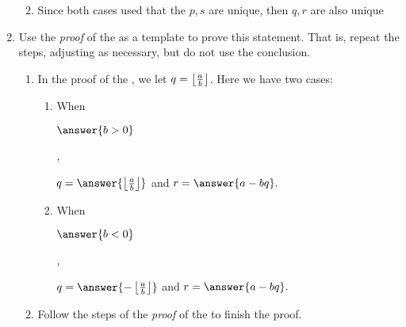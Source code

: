 \documentclass{ximera}
\begin{document}
\begin{br}
\begin{enumerate}
\begin{enumerate}
\begin{enumerate}
      		\end{enumerate}
      		\item Since both cases used that the $p,s$ are unique, then $q,r$ are also unique
	\end{enumerate}
    	\item Use the \emph{proof} of the  as a template to prove this statement. That is, repeat the steps, adjusting as necessary, but do not use the conclusion.
    	\begin{enumerate}
    		\item In the proof of the , we let $q=\left\lfloor \frac{a}{b}\right\rfloor$. Here we have two cases:
    		\begin{enumerate}
      			\item When 
				\begin{prompt}
					$\answer{b>0}$
				\end{prompt}, 
				\begin{prompt}
					$q=\answer{\floor{\frac{a}{b}}}$ and $r=\answer{a-bq}.$
				\end{prompt}

      			\item When 
				\begin{prompt}
					$\answer{b<0}$
				\end{prompt}, 
				\begin{prompt}
					$q=\answer{-\floor{\frac{a}{b}}}$ and $r=\answer{a-bq}.$
				\end{prompt}
		\end{enumerate}
    		\item Follow the steps of the \emph{proof} of the  to finish the proof.
    	\end{enumerate}

\end{enumerate}


\end{br}
\end{document}
